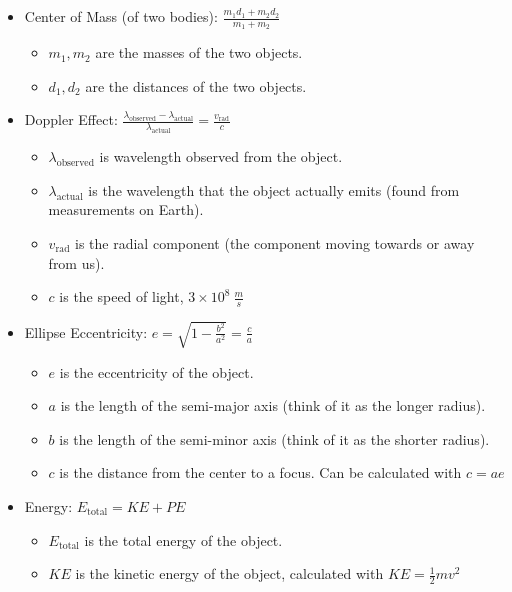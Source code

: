 \documentclass[letterpaper,14pt]{extarticle}
\begin{document}
\begin{itemize}
    \item Center of Mass (of two bodies): $\frac{m_1d_1 + m_2d_2}{m_1 + m_2}$
    \begin{itemize}
        \item $m_1, m_2$ are the masses of the two objects.
        \item $d_1, d_2$ are the distances of the two objects.
    \end{itemize}
    \pagebreak
    \item Doppler Effect: $\frac{\lambda_{\text{observed}} - \lambda_{\text{actual}}}{\lambda_{\text{actual}}} = \frac{v_{\text{rad}}}{c}$
    \begin{itemize}
        \item $\lambda_{\text{observed}}$ is wavelength observed from the object.
        \item $\lambda_{\text{actual}}$ is the wavelength that the object actually emits (found from measurements on Earth).
        \item $v_{\text{rad}}$ is the radial component (the component moving towards or away from us).
        \item $c$ is the speed of light, $3 \times 10^8\ \frac{m}{s}$
    \end{itemize}
    \item Ellipse Eccentricity: $e = \sqrt{1 - \frac{b^2}{a^2}} = \frac{c}{a}$
    \begin{center}
        
    \end{center}
    \begin{itemize}
        \item $e$ is the eccentricity of the object.
        \item $a$ is the length of the semi-major axis (think of it as the longer radius).
        \item $b$ is the length of the semi-minor axis (think of it as the shorter radius).
        \item $c$ is the distance from the center to a focus. Can be calculated with $c = ae$
    \end{itemize}
    \pagebreak
    \item Energy: $E_{\text{total}} = KE + PE$
    \begin{itemize}
        \item $E_{\text{total}}$ is the total energy of the object.
        \item $KE$ is the kinetic energy of the object, calculated with $KE = \frac{1}{2}mv^2$

\end{itemize}
\end{itemize}
\end{document}
